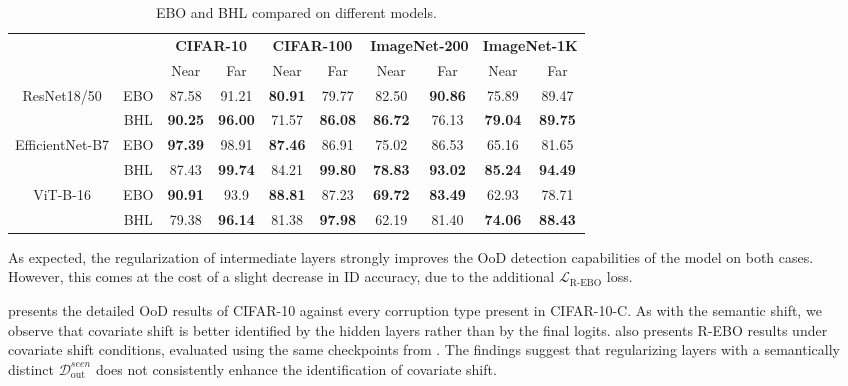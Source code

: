 \documentclass[10pt,twocolumn,a4paper]{article}
\newcommand{\minisection}[1]{\vspace{0.03in} \noindent {\bf #1}}
\begin{document}
\begin{table*}[ht]
    \centering
    \begin{tabular}{cccccccccc} 
        \toprule
        & & \multicolumn{2}{c}{\textbf{CIFAR-10}} & \multicolumn{2}{c}{\textbf{CIFAR-100}} & \multicolumn{2}{c}{\textbf{ImageNet-200}} & \multicolumn{2}{c}{\textbf{ImageNet-1K}} \\
        & & Near & Far & Near & Far & Near & Far & Near & Far\\
        \midrule
        \multirow{2}{*}{ResNet18/50} & EBO & 87.58 & 91.21 & \textbf{80.91} & 79.77 & 82.50 & \textbf{90.86} & 75.89 & 89.47 \\
        & BHL & \textbf{90.25} & \textbf{96.00} & 71.57 & \textbf{86.08} & \textbf{86.72} & 76.13 & \textbf{79.04} & \textbf{89.75}\\
        \midrule
        \multirow{2}{*}{EfficientNet-B7} & EBO & \textbf{97.39} & 98.91 & \textbf{87.46} & 86.91 & 75.02 & 86.53 & 65.16 & 81.65 \\
        & BHL & 87.43 & \textbf{99.74} & 84.21 & \textbf{99.80} & \textbf{78.83} & \textbf{93.02} & \textbf{85.24} & \textbf{94.49} \\
        \midrule
        \multirow{2}{*}{ViT-B-16} & EBO & \textbf{90.91} & 93.9 & \textbf{88.81} & 87.23 & \textbf{69.72} & \textbf{83.49} & 62.93 & 78.71 \\
        & BHL & 79.38 & \textbf{96.14} & 81.38 & \textbf{97.98} & 62.19 & 81.40 & \textbf{74.06} & \textbf{88.43} \\
        
        \bottomrule
    \end{tabular}
    \caption{EBO and BHL compared on different models.}
    \label{tab:otherarchs}
\end{table*}

As expected, the regularization of intermediate layers strongly improves the OoD detection capabilities of the model on both cases. However, this comes at the cost of a slight decrease in ID accuracy, due to the additional $\mathcal{L}_{\text{R-EBO}}$ loss.

\minisection{Covariate shift.}  presents the detailed OoD results of \textsc{CIFAR-10} against every corruption type present in \textsc{CIFAR-10-C}. As with the semantic shift, we observe that covariate shift is better identified by the hidden layers rather than by the final logits.
 also presents R-EBO results under covariate shift conditions, evaluated using the same checkpoints from . The findings suggest that regularizing layers with a semantically distinct $\mathcal{D}_{\text{out}}^{seen}$ does not consistently enhance the identification of covariate shift.
\end{document}
